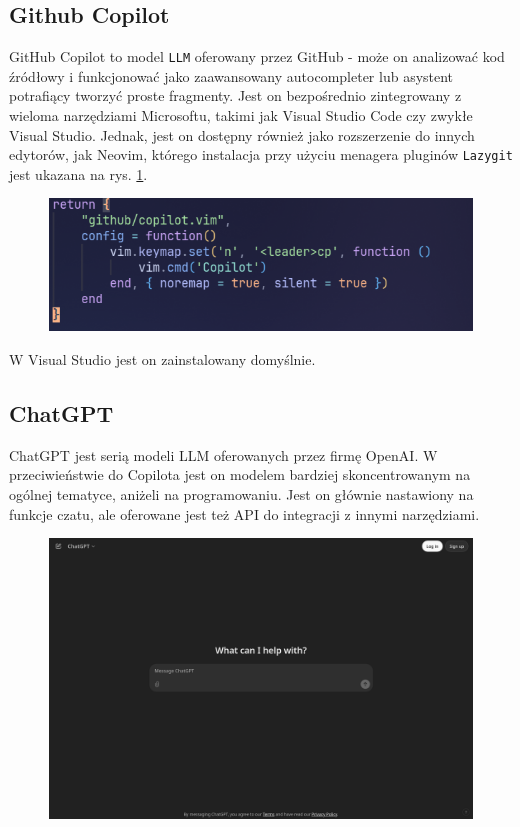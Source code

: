 \subsection{Github Copilot}

GitHub Copilot\cite{copilotsite} to model \texttt{LLM} oferowany przez GitHub - może on analizować kod źródłowy i funkcjonować jako zaawansowany autocompleter lub asystent potrafiący tworzyć proste fragmenty. Jest on bezpośrednio zintegrowany z wieloma narzędziami Microsoftu, takimi jak Visual Studio Code czy zwykłe Visual Studio. Jednak, jest on dostępny również jako rozszerzenie do innych edytorów, jak Neovim, którego instalacja przy użyciu menagera pluginów \texttt{Lazygit} jest ukazana na rys. \ref{fig:copilot_install}.

\begin{figure}[H]
	\centering
	\includegraphics[width=1\textwidth]{images/copilot-plugin.png}
	\caption{}
	\label{fig:copilot_install}
\end{figure}

W Visual Studio jest on zainstalowany domyślnie.

\subsection{ChatGPT}

ChatGPT\cite{chatgptsite} jest serią modeli LLM oferowanych przez firmę OpenAI. W przeciwieństwie do Copilota jest on modelem bardziej skoncentrowanym na ogólnej tematyce, aniżeli na programowaniu. Jest on głównie nastawiony na funkcje czatu, ale oferowane jest też API do integracji z innymi narzędziami. 

\begin{figure}[H]
	\centering
	\includegraphics[width=1\textwidth]{images/chatgpt_site.png}
	\caption{}
	\label{fig:chatgptsite}
\end{figure}
